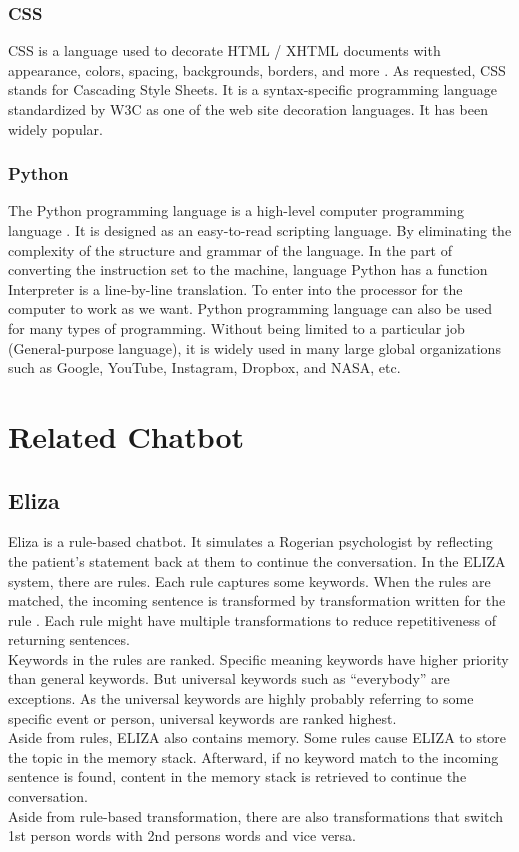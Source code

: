 \documentclass[12pt,oneside,openright,a4paper]{cpe-english-project}
\begin{document}
\subsubsection{CSS}
CSS is a language used to decorate HTML / XHTML documents with appearance, colors, spacing,
backgrounds, borders, and more \cite{ultimate_guide_css}
. As requested, CSS stands for Cascading Style Sheets. It is a syntax-specific programming
language standardized by W3C as one of the web site decoration languages. It has been widely
popular.

\subsubsection{Python}
The Python programming language is a high-level computer programming language \cite{keras}. 
It is designed as an easy-to-read scripting language. By eliminating the complexity
of the structure and grammar of the language. In the part of converting the instruction
set to the machine, language Python has a function Interpreter is a line-by-line translation.
To enter into the processor for the computer to work as we want. Python programming language
can also be used for many types of programming. Without being limited to a particular
job (General-purpose language), it is widely used in many large global organizations such as
Google, YouTube, Instagram, Dropbox, and NASA, etc.

\section{Related Chatbot}
\subsection{Eliza}
Eliza is a rule-based chatbot. It simulates a Rogerian psychologist by reflecting the patient’s
statement back at them to continue the conversation. In the ELIZA system, there are rules. Each
rule captures some keywords. When the rules are matched, the incoming sentence is transformed
by transformation written for the rule \cite{what_is_eliza}. Each rule might have multiple
transformations to reduce repetitiveness of returning sentences.\\
Keywords in the rules are ranked. Specific meaning keywords have higher priority than general
keywords. But universal keywords such as “everybody” are exceptions. As the universal keywords
are highly probably referring to some specific event or person, universal keywords are ranked
highest.\\
Aside from rules, ELIZA also contains memory. Some rules cause ELIZA to store the topic in the
memory stack. Afterward, if no keyword match to the incoming sentence is found, content in the
memory stack is retrieved to continue the conversation.\\
Aside from rule-based transformation, there are also transformations that switch 1st person
words with 2nd persons words and vice versa.
\end{document}
